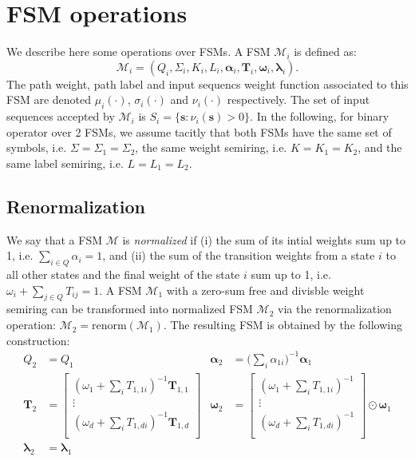 \section{FSM operations}
\label{sec:fsmops}

We describe here some operations over FSMs. A FSM $\mathcal{M}_i$ is
defined as:
\begin{equation}
    \mathcal{M}_i = (Q_i, \Sigma_i, K_i, L_i, \boldsymbol{\alpha}_i,
        \mathbf{T}_i, \boldsymbol{\omega}_i, \boldsymbol{\lambda}_i).
\end{equation}
The path weight, path label and input sequencs weight function
associated to this FSM are denoted $\mu_i(\cdot)$, $\sigma_i(\cdot)$ and
$\nu_i(\cdot)$ respectively. The set of input sequences accepted by
$\mathcal{M}_i$ is $S_i = \{\mathbf{s}: \nu_i(\mathbf{s}) > 0 \}$. In
the following, for binary operator over 2 FSMs, we assume tacitly that
both FSMs have the same set of symbols, i.e. $\Sigma = \Sigma_1 = \Sigma_2$,
the same weight semiring, i.e. $K = K_1 = K_2$, and the same label semiring,
i.e. $L = L_1 = L_2$.

\subsection{Renormalization}

We say that a FSM $\mathcal{M}$ is \emph{normalized} if (i) the sum
of its intial weights sum up to 1, i.e. $\sum_{i \in Q} \alpha_i = 1$,
and (ii) the sum of the transition weights from a state $i$ to all
other states and the final weight of the
state $i$ sum up to 1, i.e. $\omega_i + \sum_{j \in Q} T_{ij} = 1$.
A FSM $\mathcal{M}_1$ with a zero-sum free and divisble weight
semiring can be transformed into normalized FSM $\mathcal{M}_2$ via
the renormalization operation: $\mathcal{M}_2 = \text{renorm}(\mathcal{M}_1)$.
The resulting FSM is obtained by the following construction:
\begin{align}
    Q_2 &= Q_1 & \boldsymbol{\alpha}_2 &=
        \Big(\sum_i \alpha_{1i} \Big)^{-1}\boldsymbol{\alpha}_{1}  \\
        \mathbf{T}_2 &= \begin{bmatrix}
            (\omega_1 + \sum_i T_{1,1i})^{-1} \mathbf{T}_{1,1} \\
            \vdots \\
            (\omega_d + \sum_i T_{1,di})^{-1} \mathbf{T}_{1,d} \\
        \end{bmatrix} & \boldsymbol{\omega}_2 &= \begin{bmatrix}
        (\omega_1 + \sum_i T_{1,1i})^{-1} \\
        \vdots \\
        (\omega_d + \sum_i T_{1,di})^{-1} \\
        \end{bmatrix} \odot \boldsymbol{\omega}_1 \\
        \boldsymbol{\lambda}_2 &= \boldsymbol{\lambda}_1 & &
\end{align}


